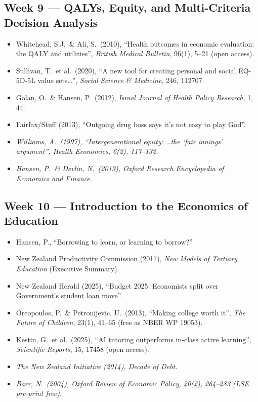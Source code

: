 \documentclass[11pt, a4paper]{article}
\begin{document}
\subsection{Week 9 — QALYs, Equity, and Multi-Criteria Decision Analysis}
\begin{itemize}
  \item Whitehead, S.J.\ \& Ali, S.\ (2010), ``Health outcomes in economic evaluation: the QALY and utilities'', \textit{British Medical Bulletin}, 96(1), 5--21 (open access).
  \item Sullivan, T.\ et al.\ (2020), ``A new tool for creating personal and social EQ-5D-5L value sets…'', \textit{Social Science \& Medicine}, 246, 112707.
  \item Golan, O.\ \& Hansen, P.\ (2012), \textit{Israel Journal of Health Policy Research}, 1, 44.
  \item Fairfax/Stuff (2013), ``Outgoing drug boss says it's not easy to play God''.
  \item \emph{Williams, A.\ (1997), ``Intergenerational equity: …the `fair innings' argument'', \textit{Health Economics}, 6(2), 117--132.}
  \item \emph{Hansen, P.\ \& Devlin, N.\ (2019), \textit{Oxford Research Encyclopedia of Economics and Finance}.}
\end{itemize}

\subsection{Week 10 — Introduction to the Economics of Education}
\begin{itemize}
  \item Hansen, P., ``Borrowing to learn, or learning to borrow?''
  \item New Zealand Productivity Commission (2017), \textit{New Models of Tertiary Education} (Executive Summary).
  \item New Zealand Herald (2025), ``Budget 2025: Economists split over Government's student loan move''.
  \item Oreopoulos, P.\ \& Petronijevic, U.\ (2013), ``Making college worth it'', \textit{The Future of Children}, 23(1), 41--65 (free as NBER WP 19053).
  \item Kestin, G.\ et al.\ (2025), ``AI tutoring outperforms in-class active learning'', \textit{Scientific Reports}, 15, 17458 (open access).
  \item \emph{The New Zealand Initiative (2014), \textit{Decade of Debt}.}
  \item \emph{Barr, N.\ (2004), \textit{Oxford Review of Economic Policy}, 20(2), 264--283 (LSE pre-print free).}
\end{itemize}
\end{document}
